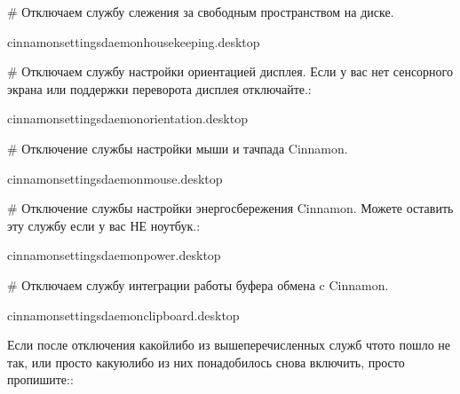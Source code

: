 \documentclass[letterpaper,10pt,russian,openany]{sphinxmanual}
\begin{document}
\sphinxAtStartPar
\# Отключаем службу слежения за свободным пространством на диске.

\begin{sphinxVerbatim}[commandchars=\\\{\}]
  \PYGZgt{}\PYGZgt{} cinnamon\PYGZhy{}settings\PYGZhy{}daemon\PYGZhy{}housekeeping.desktop
\end{sphinxVerbatim}

\sphinxAtStartPar
\# Отключаем службу настройки ориентацией дисплея. Если у вас нет сенсорного экрана или поддержки переворота дисплея \sphinxhyphen{} отключайте.:

\begin{sphinxVerbatim}[commandchars=\\\{\}]
  \PYGZgt{}\PYGZgt{} cinnamon\PYGZhy{}settings\PYGZhy{}daemon\PYGZhy{}orientation.desktop
\end{sphinxVerbatim}

\sphinxAtStartPar
\# Отключение службы настройки мыши и тачпада Cinnamon.

\begin{sphinxVerbatim}[commandchars=\\\{\}]
  \PYGZgt{}\PYGZgt{} cinnamon\PYGZhy{}settings\PYGZhy{}daemon\PYGZhy{}mouse.desktop
\end{sphinxVerbatim}

\sphinxAtStartPar
\# Отключение службы настройки энергосбережения Cinnamon. Можете оставить эту службу если у вас НЕ ноутбук.:

\begin{sphinxVerbatim}[commandchars=\\\{\}]
  \PYGZgt{}\PYGZgt{} cinnamon\PYGZhy{}settings\PYGZhy{}daemon\PYGZhy{}power.desktop
\end{sphinxVerbatim}

\sphinxAtStartPar
\# Отключаем службу интеграции работы буфера обмена c Cinnamon.

\begin{sphinxVerbatim}[commandchars=\\\{\}]
  \PYGZgt{}\PYGZgt{} cinnamon\PYGZhy{}settings\PYGZhy{}daemon\PYGZhy{}clipboard.desktop
\end{sphinxVerbatim}

\sphinxAtStartPar
Если после отключения какой\sphinxhyphen{}либо из вышеперечисленных служб что\sphinxhyphen{}то пошло не так, или просто какую\sphinxhyphen{}либо из них понадобилось снова включить, просто пропишите::
\end{document}
